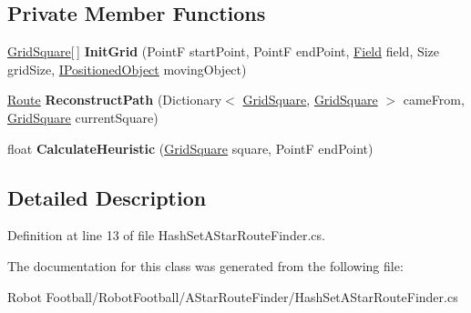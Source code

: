 \subsection*{Private Member Functions}
\begin{DoxyCompactItemize}
\item 
\hypertarget{class_route_finders_1_1_hash_set_a_star_route_finder_a89be293974c9bb8ac7f6ec9dc8b6c8cf}{\hyperlink{class_route_finders_1_1_grid_square}{Grid\-Square}\mbox{[}$\,$\mbox{]} {\bfseries Init\-Grid} (Point\-F start\-Point, Point\-F end\-Point, \hyperlink{class_robot_football_core_1_1_objects_1_1_field}{Field} field, Size grid\-Size, \hyperlink{interface_robot_football_core_1_1_interfaces_1_1_i_positioned_object}{I\-Positioned\-Object} moving\-Object)}\label{class_route_finders_1_1_hash_set_a_star_route_finder_a89be293974c9bb8ac7f6ec9dc8b6c8cf}

\item 
\hypertarget{class_route_finders_1_1_hash_set_a_star_route_finder_a674d456775153b1d41c406cbc62d6b21}{\hyperlink{class_robot_football_core_1_1_route_objects_1_1_route}{Route} {\bfseries Reconstruct\-Path} (Dictionary$<$ \hyperlink{class_route_finders_1_1_grid_square}{Grid\-Square}, \hyperlink{class_route_finders_1_1_grid_square}{Grid\-Square} $>$ came\-From, \hyperlink{class_route_finders_1_1_grid_square}{Grid\-Square} current\-Square)}\label{class_route_finders_1_1_hash_set_a_star_route_finder_a674d456775153b1d41c406cbc62d6b21}

\item 
\hypertarget{class_route_finders_1_1_hash_set_a_star_route_finder_a02ea79b75addaf1de519d790b1343ca8}{float {\bfseries Calculate\-Heuristic} (\hyperlink{class_route_finders_1_1_grid_square}{Grid\-Square} square, Point\-F end\-Point)}\label{class_route_finders_1_1_hash_set_a_star_route_finder_a02ea79b75addaf1de519d790b1343ca8}

\end{DoxyCompactItemize}


\subsection{Detailed Description}


Definition at line 13 of file Hash\-Set\-A\-Star\-Route\-Finder.\-cs.



The documentation for this class was generated from the following file\-:\begin{DoxyCompactItemize}
\item 
Robot Football/\-Robot\-Football/\-A\-Star\-Route\-Finder/Hash\-Set\-A\-Star\-Route\-Finder.\-cs\end{DoxyCompactItemize}
